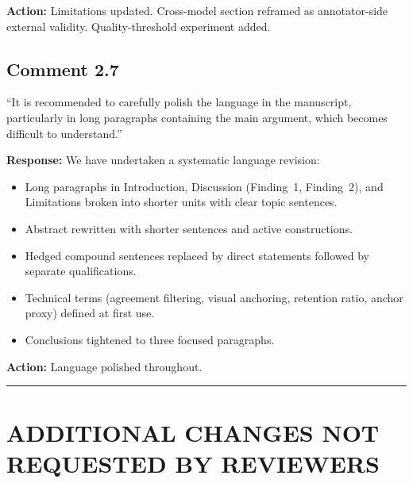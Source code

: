 \documentclass[11pt]{article}
\begin{document}
\textbf{Action:} Limitations updated. Cross-model section reframed as annotator-side external validity. Quality-threshold experiment added.

\subsection*{Comment 2.7}

``It is recommended to carefully polish the language in the manuscript, particularly in long paragraphs containing the main argument, which becomes difficult to understand.''

\textbf{Response:} We have undertaken a systematic language revision:
\begin{itemize}[nosep]
  \item[(a)] Long paragraphs in Introduction, Discussion (Finding~1, Finding~2), and Limitations broken into shorter units with clear topic sentences.
  \item[(b)] Abstract rewritten with shorter sentences and active constructions.
  \item[(c)] Hedged compound sentences replaced by direct statements followed by separate qualifications.
  \item[(d)] Technical terms (agreement filtering, visual anchoring, retention ratio, anchor proxy) defined at first use.
  \item[(e)] Conclusions tightened to three focused paragraphs.
\end{itemize}

\textbf{Action:} Language polished throughout.

\rule{\textwidth}{0.4pt}

\section*{ADDITIONAL CHANGES NOT REQUESTED BY REVIEWERS}
\end{document}
